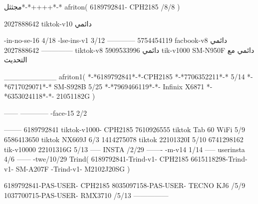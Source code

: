 مجثثل*-*++++*-*
afriton(
6189792841- CPH2185  /8/8
)

2027888642 tiktok-v10
دائمي

-in-no-se-16 4/18
-lse-ins-v1 3/12
------------
5754454119 facbook-v8
دائمي
--------------
2027888642 tiktok-v8
دائمي
5909533996 tik-v1000  SM-N950F
دائمي مع التحديث

__________
afriton1(
*-*6189792841*-*-CPH2185
*-*7706352211*-* 5/14
*-*6717029071*-*  SM-S928B 5/25
*-*7969466119*-*- Infinix X6871 \5
*-*6353024118*-*- 21051182G \5
)


------
------------
-face-15 2/2

--------
6189792841 tiktok-v1000- CPH2185 
7610926555 tiktok Tab 60 WiFi  5/9
6586413650 tiktok NX669J  6/3
1414275078 tiktok 22101320I  5/10
6741298162 tik-v10000 22101316G  5/13
-----
 INSTA /2/29
-------
-m-v14 1/14
-----
userinsta 4/6
------
-twe/10/29
Trind(
6189792841-Trind-v1- CPH2185 
6615118298-Trind-v1- SM-A207F \5-Trind-v1- M2102J20SG \5
)

6189792841-PAS-USER- CPH2185 
8035097158-PAS-USER- TECNO KJ6  /5/9
1037700715-PAS-USER- RMX3710  /5/13
    ---------------

